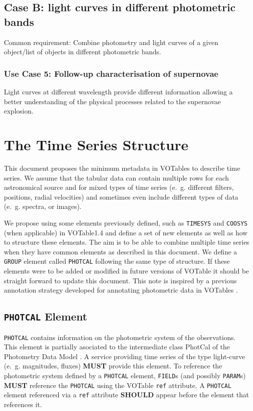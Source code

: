 \documentclass[11pt,a4paper]{ivoa}
\let\fg=\color
\def\attr#1{{\tt{\fg{DarkRed}#1}}}
\def\elem#1{{\tt{\fg{DarkRed}#1}}}
\begin{document}
\subsection{Case B: light curves in different photometric bands}
Common requirement: Combine photometry and light curves of a given object/list of objects in different photometric bands.

\subsubsection{Use Case 5: Follow-up characterisation of supernovae}
Light curves at different wavelength provide different information allowing a better understanding of the physical processes related to the supernovae explosion.

\section{The Time Series Structure}
\label{elem:TIMESERIES}
This document proposes the minimum metadata in VOTables to describe time series. We assume that the tabular data can contain multiple rows for each astronomical source and for mixed types of time series (e.~g. different filters, positions, radial velocities) and sometimes even include different types of data (e.~g. spectra, or images). 

We propose using some elements previously defined, such as \elem{TIMESYS} and \elem{COOSYS} (when applicable) in VOTable1.4 \cite{VOTable1.4} and define a set of new elements as well as how to structure these elements. The aim is to be able to combine multiple time series when they have common elements as described in this document. We define a \elem{GROUP} element called \elem{PHOTCAL} following the same type of structure. If these elements were to be added or modified in future versions of VOTable it should be straight forward to update this document. This note is inspired by a previous annotation strategy developed for annotating photometric data in VOTables \citep{note:seb2010-1}.

%
%

\subsection{\elem{PHOTCAL} Element}
\elem{PHOTCAL} contains information on the photometric system of the observations. This element is partially asociated to the intermediate class PhotCal of the Photometry Data Model \cite{PhotometryDM}. A service providing time series of the type light-curve (e.~g. magnitudes, fluxes) \textbf{MUST} provide this element. To reference the photometric system defined by a \elem{PHOTCAL} element, \elem{FIELD}s (and possibly \elem{PARAM}s) \textbf{MUST} reference the \elem{PHOTCAL} using the VOTable \attr{ref} attribute. A \elem{PHOTCAL} element referenced via a \attr{ref} attribute \textbf{SHOULD} appear before the element that references it. 
\end{document}
